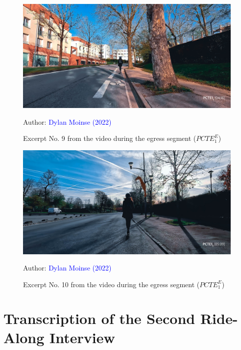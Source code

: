     \begin{figure}[h!]\vspace*{4pt}
        \caption*{Excerpt No. 9 from the video during the egress segment (\(PCTE^{E}_{1}\))}
        \centerline{\includegraphics[width=0.75\columnwidth]{src/Figures/Annexes/Extrait_Video_PCTE1_Egress_9.jpg}}
        \vspace{5pt}
        \begin{flushright}\scriptsize{
        Author: \textcolor{blue}{Dylan Moinse (2022)}
        }\end{flushright}
    \end{figure}

    \begin{figure}[h!]\vspace*{4pt}
        \caption*{Excerpt No. 10 from the video during the egress segment (\(PCTE^{E}_{1}\))}
        \centerline{\includegraphics[width=0.75\columnwidth]{src/Figures/Annexes/Extrait_Video_PCTE1_Egress_10.jpg}}
        \vspace{5pt}
        \begin{flushright}\scriptsize{
        Author: \textcolor{blue}{Dylan Moinse (2022)}
        }\end{flushright}
    \end{figure}

    \newpage
\section{Transcription of the Second Ride-Along Interview}
    \label{annexes:retranscription-pcte2}

